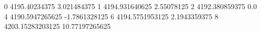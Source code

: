 0 4195.40234375 3.021484375
1 4194.931640625 2.55078125
2 4192.380859375 0.0
4 4190.5947265625 -1.7861328125
6 4194.5751953125 2.1943359375
8 4203.15283203125 10.77197265625
